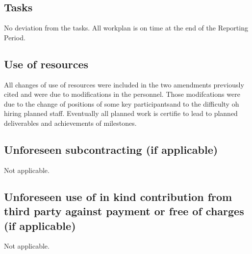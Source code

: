 \documentclass{deliverablereport}
\begin{document}
  \subsection{Tasks}

No deviation from the tasks. All workplan is on time at the end of the Reporting Period.

  \subsection{Use of resources}

All changes of use of resources were included in the two amendments previously cited and were
due to modifications in the personnel. Those modifcations were due to the change of positions 
of some key \ODK participantsand to the difficulty oh hiring planned staff. Eventually all
planned work is certifie to lead to planned deliverables and achievements of milestones.

  \subsection{Unforeseen subcontracting (if applicable)}

Not applicable.  

  \subsection{Unforeseen use of in kind contribution from third party against payment or
    free of charges (if applicable)}

 Not applicable. 

\newpage
\printbibliography
\end{document}
